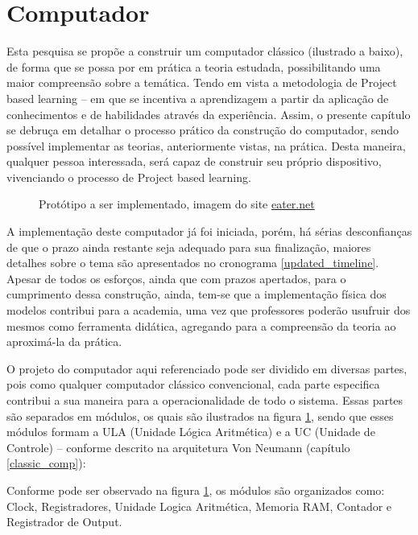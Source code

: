 \section{Computador} 
\label{computer}
Esta pesquisa se propõe a construir um computador clássico (ilustrado a baixo), de forma que se possa por em prática a teoria estudada, possibilitando uma maior compreensão sobre a temática. Tendo em vista a metodologia de Project based learning – em que se incentiva a aprendizagem a partir da aplicação de conhecimentos e de habilidades através da experiência. Assim, o presente capítulo se debruça em detalhar o processo prático da construção do computador, sendo possível implementar as teorias, anteriormente vistas, na prática. Desta maneira, qualquer pessoa interessada, será capaz de construir seu próprio dispositivo, vivenciando o processo de Project based learning. 

\vspace{1cm}
\begin{figure}[H] \centering 
  \caption{\label{breadboard_computer} Protótipo a ser implementado, imagem do site \href{https://eater.net/}{eater.net}} 
\end{figure}

A implementação deste computador já foi iniciada, porém, há sérias desconfianças de que o prazo ainda restante seja adequado para sua finalização, maiores detalhes sobre o tema são apresentados no cronograma \ref{updated_timeline}. Apesar de todos os esforços, ainda que com prazos apertados, para o cumprimento dessa construção, ainda, tem-se que a implementação física dos modelos contribui para a academia, uma vez que professores poderão usufruir dos mesmos como ferramenta didática, agregando para a compreensão da teoria ao aproximá-la da prática.

O projeto do computador aqui referenciado pode ser dividido em diversas partes, pois como qualquer computador clássico convencional, cada parte especifica contribui a sua maneira para a operacionalidade de todo o sistema. Essas partes são separados em módulos, os quais são ilustrados na figura \ref{breadboard_computer}, sendo que esses módulos formam a ULA (Unidade Lógica Aritmética) e a UC (Unidade de Controle) – conforme descrito na arquitetura Von Neumann (capítulo \ref{classic_comp}):

Conforme pode ser observado na figura \ref{breadboard_computer}, os módulos são organizados como: Clock, Registradores, Unidade Logica Aritmética, Memoria RAM, Contador e Registrador de Output.

